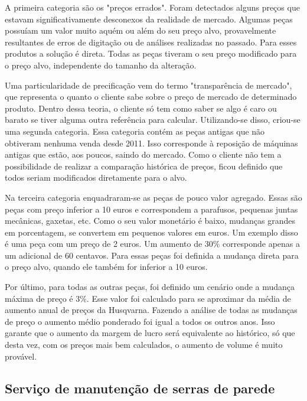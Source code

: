 \documentclass[12pt]{article}
\begin{document}
	A primeira categoria são os "preços errados". Foram detectados alguns preços que estavam significativamente desconexos da realidade de mercado. Algumas peças possuíam um valor muito aquém ou além do seu preço alvo, provavelmente resultantes de erros de digitação ou de análises realizadas no passado. Para esses produtos a solução é direta. Todas as peças tiveram o seu preço modificado para o preço alvo, independente do tamanho da alteração.

	Uma particularidade de precificação vem do termo "transparência de mercado", que representa o quanto o cliente sabe sobre o preço de mercado de determinado produto. Dentro dessa teoria, o cliente só tem como saber se algo é caro ou barato se tiver alguma outra referência para calcular. Utilizando-se disso, criou-se uma segunda categoria. Essa categoria contém as peças antigas que não obtiveram nenhuma venda desde 2011. Isso corresponde à reposição de máquinas antigas que estão, aos poucos, saindo do mercado. Como o cliente não tem a possibilidade de realizar a comparação histórica de preços, ficou definido que todos seriam modificados diretamente para o alvo.

	Na terceira categoria enquadraram-se as peças de pouco valor agregado. Essas são peças com preço inferior a 10 euros e correspondem a parafusos, pequenas juntas mecânicas, gaxetas, etc. Como o seu valor monetário é baixo, mudanças grandes em porcentagem, se convertem em pequenos valores em euros. Um exemplo disso é uma peça com um preço de 2 euros. Um aumento de 30\% corresponde apenas a um adicional de 60 centavos. Para essas peças foi definida a mudança direta para o preço alvo, quando ele também for inferior a 10 euros.

	Por último, para todas as outras peças, foi definido um cenário onde a mudança máxima de preço é 3\%. Esse valor foi calculado para se aproximar da média de aumento anual de preços da Husqvarna. Fazendo a análise de todas as mudanças de preço o aumento médio ponderado foi igual a todos os outros anos. Isso garante que o aumento da margem de lucro será equivalente ao histórico, só que desta vez, com os preços mais bem calculados, o aumento de volume é muito provável.
	

\subsection{Serviço de manutenção de serras de parede}
\end{document}
